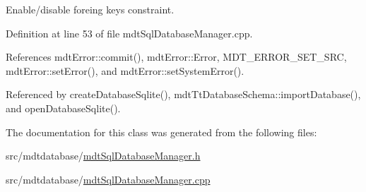 Enable/disable foreing keys constraint. 



Definition at line 53 of file mdt\-Sql\-Database\-Manager.\-cpp.



References mdt\-Error\-::commit(), mdt\-Error\-::\-Error, M\-D\-T\-\_\-\-E\-R\-R\-O\-R\-\_\-\-S\-E\-T\-\_\-\-S\-R\-C, mdt\-Error\-::set\-Error(), and mdt\-Error\-::set\-System\-Error().



Referenced by create\-Database\-Sqlite(), mdt\-Tt\-Database\-Schema\-::import\-Database(), and open\-Database\-Sqlite().



The documentation for this class was generated from the following files\-:\begin{DoxyCompactItemize}
\item 
src/mdtdatabase/\hyperlink{mdt_sql_database_manager_8h}{mdt\-Sql\-Database\-Manager.\-h}\item 
src/mdtdatabase/\hyperlink{mdt_sql_database_manager_8cpp}{mdt\-Sql\-Database\-Manager.\-cpp}\end{DoxyCompactItemize}
